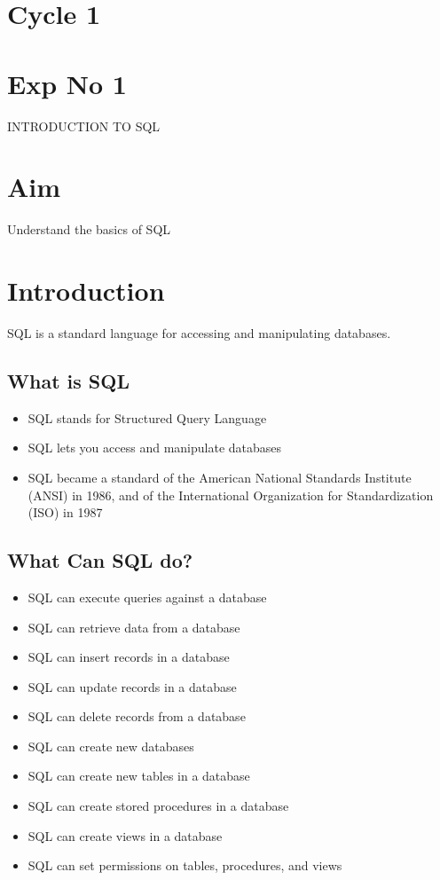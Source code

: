 \documentclass{article}
\begin{document}
\section*{Cycle 1}
\section*{Exp No 1}
\begin{center}
    \Large{INTRODUCTION TO SQL}
\end{center}

\section{Aim}
\large Understand the basics of SQL

\section{Introduction}

SQL is a standard language for accessing and manipulating databases.

\subsection{What is SQL}
\begin{itemize}
   \item SQL stands for Structured Query Language
   \item SQL lets you access and manipulate databases
    \item SQL became a standard of the American National Standards Institute (ANSI) in 1986, and of the International Organization for  Standardization (ISO) in 1987
\end{itemize}
\subsection{What Can SQL do?}
\begin{itemize}
    \item  SQL can execute queries against a database
    \item SQL can retrieve data from a database
    \item SQL can insert records in a database
    \item SQL can update records in a database
    \item SQL can delete records from a database
    \item SQL can create new databases
    \item SQL can create new tables in a database
    \item SQL can create stored procedures in a database
    \item SQL can create views in a database
    \item SQL can set permissions on tables, procedures, and views

\end{itemize}
\end{document}

